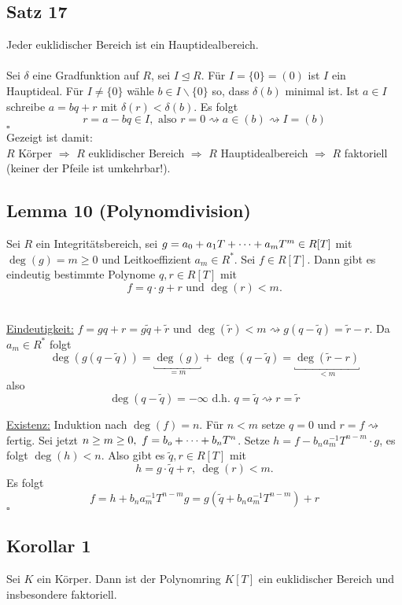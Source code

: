 \subsection{Satz 17}
\label{sub:satz_17}
Jeder euklidischer Bereich ist ein Hauptidealbereich.\\

\\
Sei $\delta$ eine Gradfunktion auf $R$, sei $I\trianglelefteq R$.
Für $I=\{0\}=(0)$ ist $I$ ein Hauptideal.
Für $I\neq \{0\}$ wähle $b\in I\backslash\{0\}$ so, dass $\delta(b)$ minimal ist.
Ist $a\in I$ schreibe $a=bq+r$ mit $\delta(r)<\delta(b)$.
Es folgt
\[
r=a-bq\in I,\text{ also } r=0\rightsquigarrow a\in (b) \rightsquigarrow I=(b)
\]
\hfill $\square$\\
Gezeigt ist damit:\\
$R$ Körper $\Rightarrow$ $R$ euklidischer Bereich $\Rightarrow$ $R$ Hauptidealbereich $\Rightarrow$ $R$ faktoriell\\
(keiner der Pfeile ist umkehrbar!).

\subsection{Lemma 10 (Polynomdivision)}
\label{sub:polynomdivision}
Sei $R$ ein Integritätsbereich, sei $g=a_0+a_1T+ \dots +a_mT^m\in R[T]$ mit $\deg(g)=m\ge 0$ und Leitkoeffizient $a_m\in R^*$.
Sei $f\in R[T]$.
Dann gibt es eindeutig bestimmte Polynome $q,r\in R[T]$ mit
\[
f=q\cdot g+r \text{ und } \deg(r)<m.
\]

\\
\uline{Eindeutigkeit:}
$f=gq+r=g\tilde{q}+\tilde{r}$ und $\deg(\tilde{r})<m \rightsquigarrow g(q-\tilde{q})=\tilde{r}-r.$
Da $a_m\in R^*$ folgt
\[
\deg(g(q-\tilde{q}))=\underbracket{\deg(g)}_{=m}+\deg(q-\tilde{q})=\underbracket{\deg(\tilde{r}-r)}_{<m}
\]
also
\[
\deg(q-\tilde{q})=-\infty \text{ d.h. } q=\tilde{q} \rightsquigarrow r=\tilde{r}
\]

\uline{Existenz:}
Induktion nach $\deg(f)=n$.
Für $n<m$ setze $q=0$ und $r=f\rightsquigarrow$ fertig.
Sei jetzt $n\ge m\ge 0,~ f=b_o+ \dots +b_nT^n$.
Setze $h=f-b_na_m^{-1}T^{n-m}\cdot g$, es folgt $\deg(h)<n$.
Also gibt es $\tilde{q},r\in R[T]$ mit
\[
h=g\cdot \tilde{q}+r,~\deg(r)<m.
\]
Es folgt
\[
f=h+b_na_m^{-1}T^{n-m}g=g(\tilde{q}+b_na_m^{-1}T^{n-m})+r
\]
\hfill $\square$

\subsection{Korollar 1}
\label{sub:korollar_1}
Sei $K$ ein Körper.
Dann ist der Polynomring $K[T]$ ein euklidischer Bereich und insbesondere faktoriell.\\

